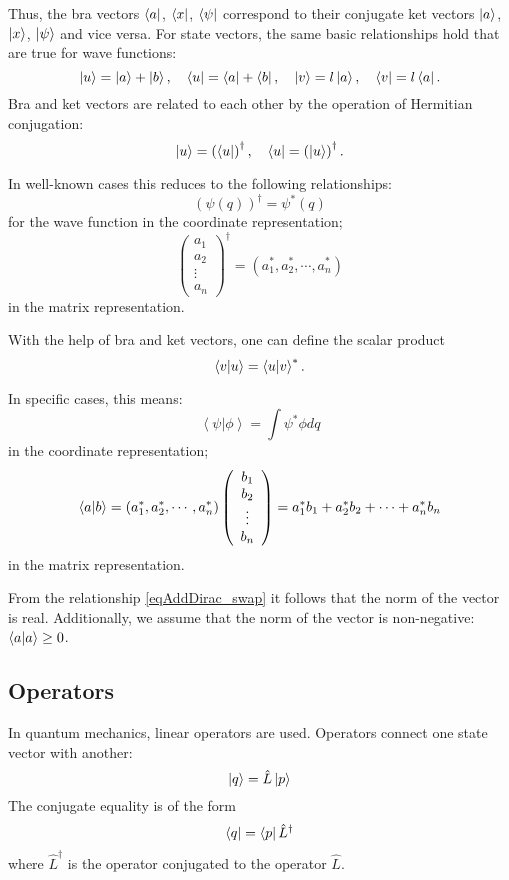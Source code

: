 Thus, the bra vectors
$\bra{ a }$, $\bra{ x }$, $\bra{ \psi }$
correspond to their conjugate ket vectors  
$\ket{ a }$,  $\ket{ x }$, $\ket{ \psi }$
and vice versa. For state vectors, the same basic relationships hold that are true for wave functions:
\begin{equation}
\ket{ u } = \ket{ a }  + \ket{ b }, \quad 
\bra{ u } = \bra{ a }  + \bra{ b }, \quad 
\ket{ v } = l \ket{ a }, \quad  
\bra{ v } = l \bra{ a }.
\end{equation}
Bra and ket vectors are related to each other by the operation of Hermitian conjugation:
\begin{equation}
\ket{ u } = \left( \bra{ u } \right)^{\dag}, \quad 
\bra{ u } = \left( \ket{ u } \right)^{\dag}.
\end{equation}

In well-known cases this reduces to the following relationships:
\[
\left( \psi\left( q \right) \right)^{\dag} = \psi^{*}\left( q \right)
\]
for the wave function in the coordinate representation;
\[
\left(
\begin{array} {c} 
a_1 \\
a_2 \\
\vdots \\
a_n
\end{array}
 \right)^{\dag} = 
\left( a_1^{*}, a_2^{*}, \cdots, a_n^{*}\right)
\]
in the matrix representation.

With the help of bra and ket vectors, one can define the scalar product
\begin{equation}
\bra{ v }\ket{ u } = \bra{ u }\ket{ v }^{*}.
\label{eqAddDirac_swap}
\end{equation}

In specific cases, this means:
\[
\left< \psi \right|\left. \phi \right> = 
\int \psi^{*} \phi dq
\]
in the coordinate representation;
\[
\bra{ a }\ket{ b } = 
\left( a_1^{*}, a_2^{*}, \cdots, a_n^{*}\right) 
\left(
\begin{array} {c} 
b_1 \\
b_2 \\
\vdots \\
b_n
\end{array}
 \right) = 
a_1^{*} b_1 +  a_2^{*} b_2 + \cdots + a_n^{*} b_n
\]
in the matrix representation.

From the relationship \eqref{eqAddDirac_swap} it follows that the norm of the vector is real. Additionally, we assume that the norm of the vector is non-negative: 
$\bra{ a }\ket{ a } \geq 0$.

\subsection{Operators}
In quantum mechanics, linear operators are used. Operators connect one state vector with another: 
\begin{equation}
\ket{ q } = \hat{L}\ket{ p }
\label{eqAddDirac_operator_property1}
\end{equation}
The conjugate equality is of the form
\begin{equation}
\bra{ q } = \bra{ p }  \hat{L}^{\dag}
\label{eqAddDirac_operator_property2}
\end{equation}
where $\hat{L}^{\dag}$ is the operator conjugated to the operator $\hat{L}$.

